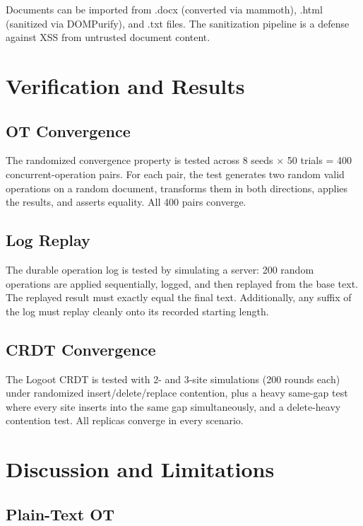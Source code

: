 \documentclass[conference]{IEEEtran}
\begin{document}
Documents can be imported from .docx (converted via mammoth), .html (sanitized via DOMPurify), and .txt files. The sanitization pipeline is a defense against XSS from untrusted document content.

\section{Verification and Results}\label{sec:results}

\subsection{OT Convergence}

The randomized convergence property is tested across 8 seeds $\times$ 50 trials = 400 concurrent-operation pairs. For each pair, the test generates two random valid operations on a random document, transforms them in both directions, applies the results, and asserts equality. All 400 pairs converge.

\subsection{Log Replay}

The durable operation log is tested by simulating a server: 200 random operations are applied sequentially, logged, and then replayed from the base text. The replayed result must exactly equal the final text. Additionally, any suffix of the log must replay cleanly onto its recorded starting length.

\subsection{CRDT Convergence}

The Logoot CRDT is tested with 2- and 3-site simulations (200 rounds each) under randomized insert/delete/replace contention, plus a heavy same-gap test where every site inserts into the same gap simultaneously, and a delete-heavy contention test. All replicas converge in every scenario.

\section{Discussion and Limitations}\label{sec:discussion}

\subsection{Plain-Text OT}
\end{document}
